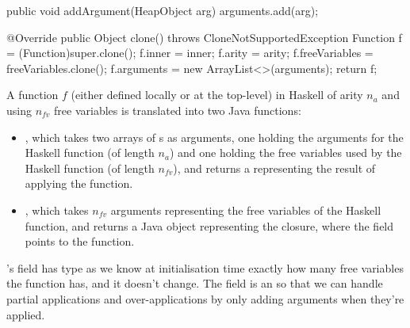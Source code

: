 \documentclass[dissertation.tex]{subfiles}
\begin{document}
{{{{\begin{javafigure}
{                    public void addArgument(HeapObject arg) {
                        arguments.add(arg);
                    }
                                
                    @Override
                    public Object clone() throws CloneNotSupportedException {
                        Function f = (Function)super.clone();
                        f.inner = inner;
                        f.arity = arity;
                        f.freeVariables = freeVariables.clone();
                        f.arguments = new ArrayList<>(arguments);
                        return f;
                    }
                }
                \end{javafigure}

                A function \(f\) (either defined locally or at the top-level) in Haskell of arity \(n_a\) and using
                \(n_{fv}\) free variables is translated into two Java functions:
                
                \begin{itemize}
                \item
                {
                    
                    , which takes two arrays of s as arguments, one holding the
                    arguments for the Haskell function (of length \(n_a\)) and one holding the free variables used by
                    the Haskell function (of length \(n_{fv}\)), and returns a  representing the result
                    of applying the function.

                }
                \item
                {

                    , which takes \(n_{fv}\) arguments representing the free variables of the
                    Haskell function, and returns a Java  object representing the closure, where the
                     field points to the  function.

                }
                \end{itemize}
                
                's  field has type  as we know at initialisation
                time exactly how many free variables the function has, and it doesn't change. The  field
                is an  so that we can handle partial applications and over-applications by
                only adding arguments when they're applied.

}}}}
\end{document}
